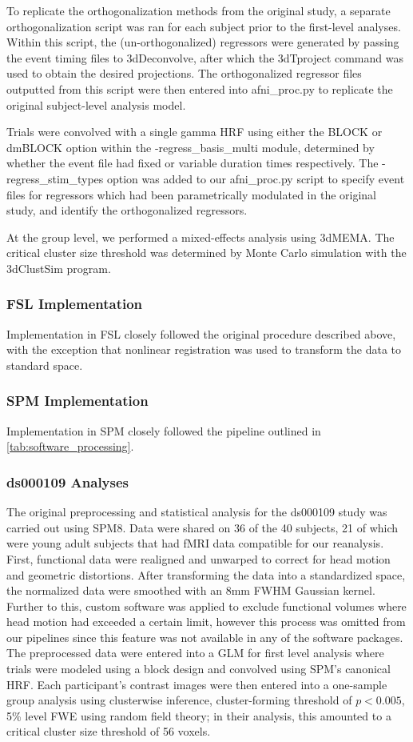 To replicate the orthogonalization methods from the original study, a separate orthogonalization script was ran for each subject prior to the first-level analyses. Within this script, the (un-orthogonalized) regressors were generated by passing the event timing files to 3dDeconvolve, after which the 3dTproject command was used to obtain the desired projections. The orthogonalized regressor files outputted from this script were then entered into afni\_proc.py to replicate the original subject-level analysis model. 

Trials were convolved with a single gamma HRF using either the BLOCK or dmBLOCK option within the -regress\_basis\_multi module, determined by whether the event file had fixed or variable duration times respectively. The -regress\_stim\_types option was added to our afni\_proc.py script to specify event files for regressors which had been parametrically modulated in the original study, and identify the orthogonalized regressors. 

At the group level, we performed a mixed-effects analysis using 3dMEMA. The critical cluster size threshold was determined by Monte Carlo simulation with the 3dClustSim program. 

\subsubsection{FSL Implementation}
Implementation in FSL closely followed the original procedure described above, with the exception that nonlinear registration was used to transform the data to standard space. 

\subsubsection{SPM Implementation}
Implementation in SPM closely followed the pipeline outlined in \ref{tab:software_processing}.

\subsubsection{ds000109 Analyses}
The original preprocessing and statistical analysis for the ds000109 study was carried out using SPM8. Data were shared on 36 of the 40 subjects, 21 of which were young adult subjects that had fMRI data compatible for our reanalysis. First, functional data were realigned and unwarped to correct for head motion and geometric distortions. After transforming the data into a standardized space, the normalized data were smoothed with an 8mm FWHM Gaussian kernel. Further to this, custom software was applied to exclude functional volumes where head motion had exceeded a certain limit, however this process was omitted from our pipelines since this feature was not available in any of the software packages. The preprocessed data were entered into a GLM for first level analysis where trials were modeled using a block design and convolved using SPM's canonical HRF. Each participant's contrast images were then entered into a one-sample group analysis using clusterwise inference, cluster-forming threshold of $p < 0.005$, 5\% level FWE using random field theory; in their analysis, this amounted to a critical cluster size threshold of 56 voxels. 

